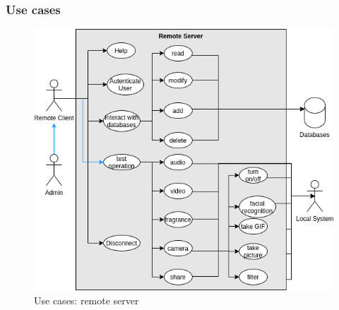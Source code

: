 \subsubsection{Use cases}
\label{sec:use-cases-2}

\begin{figure}[htb!]
\centering
    \includegraphics[width=0.6\columnwidth]{./img/use-cases-rs.png}
  \caption{Use cases: remote server}%
\label{fig:use-cases-rs}
\end{figure}

